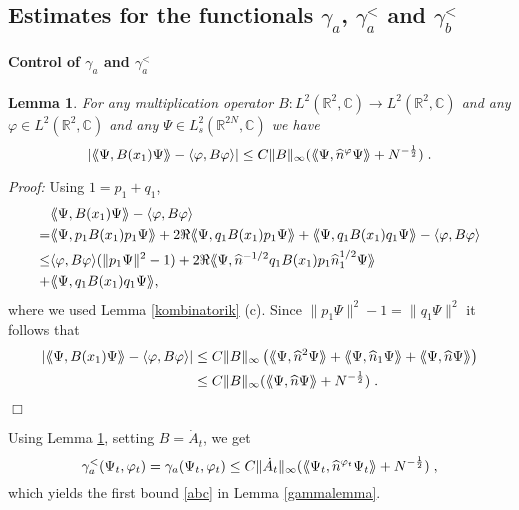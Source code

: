 \documentclass[11pt, english, american]{article}
\newcommand{\laa}{\langle\hspace{-0.08cm}\langle}
\newcommand{\raa}{\rangle\hspace{-0.08cm}\rangle}
\newtheorem{lemma}[theorem]{Lemma}
\newenvironment{proof}{\emph{Proof:}}{\begin{flushright} $ \Box $ \end{flushright}}
\renewcommand{\phi}{\varphi}
\newcommand{\asaalt}{\gamma^<_a}
\newcommand{\asa}{\gamma_a}
\begin{document}




\subsection{Estimates for the functionals $\gamma_a$, $\gamma_a^<$ and $\gamma_b^<$}\label{contgamma1}


\paragraph{Control of $\asa$ and $\asaalt$} 


\begin{lemma}\label{opdiff}
For any multiplication operator $B: L^2(\mathbb{R}^2,\mathbb{C}) \rightarrow L^2(\mathbb{R}^2,\mathbb{C})$ and any $\phi\in L^2(\mathbb{R}^ 2, \mathbb{C}) $ and any $\Psi\in L_s^2(\mathbb{R}^{2N},\mathbb{C})$ we have
$$|\laa\Psi , B(x_1) \Psi\raa-\langle\phi,B\phi\rangle|\leq C \|B\|_\infty( \laa\Psi , \widehat{n}^\phi\Psi\raa + N^{-\frac{1}{2}} ) \;.$$
\end{lemma}

\begin{proof}
Using $1=p_1+q_1$,
\begin{align*}
&\laa\Psi, B(x_1)  \Psi\raa-\langle\phi,B\phi\rangle
\\
=&
 \laa\Psi, p_1B (x_1) p_1\Psi\raa+2\Re\laa\Psi , q_1B(x_1)  p_1\Psi\raa+\laa\Psi , q_1B (x_1) q_1\Psi\raa-\langle\phi ,  B\phi\rangle
 \\
 \leq&
 \langle\phi , B\phi\rangle(\|p_1\Psi\|^2-1)+2\Re\laa\Psi, \widehat{n}^{-1/2}q_1B(x_1) p_1\widehat{n}_1^{1/2}\Psi\raa \nonumber\\
  + &\laa\Psi, q_1B(x_1) q_1\Psi\raa ,
\end{align*}
where we used Lemma \ref{kombinatorik} (c). Since $\|p_1\Psi\|^2-1 =\|q_1\Psi\|^2$
it follows that
\begin{align}\label{neededtocomplete}
|\laa\Psi, B(x_1) \Psi\raa-\langle\phi,B\phi\rangle|&\leq C\| B\|_\infty \left(\laa\Psi,\widehat{n}^2\Psi\raa+
\laa\Psi,\widehat{n}_1\Psi\raa + \laa\Psi,\widehat{n}\Psi\raa  \right)\nonumber\\
& \le C \|B\|_\infty( \laa\Psi,\widehat{n}\Psi\raa + N^{-\frac{1}{2}}) \;.
\end{align}
\end{proof}
Using Lemma \ref{opdiff}, setting $B=\dot A_t$, we get 
$$\gamma_a^<(\Psi_t,\phi_t)  =\gamma_a(\Psi_t,\phi_t) \leq C \|\dot A_t\|_\infty ( \laa\Psi_t,\widehat{n}^{\phi_t}\Psi_t\raa + N^{-\frac{1}{2}} ) \;,$$
which yields the first bound \eqref{abc} in Lemma \ref{gammalemma}.
\end{document}
